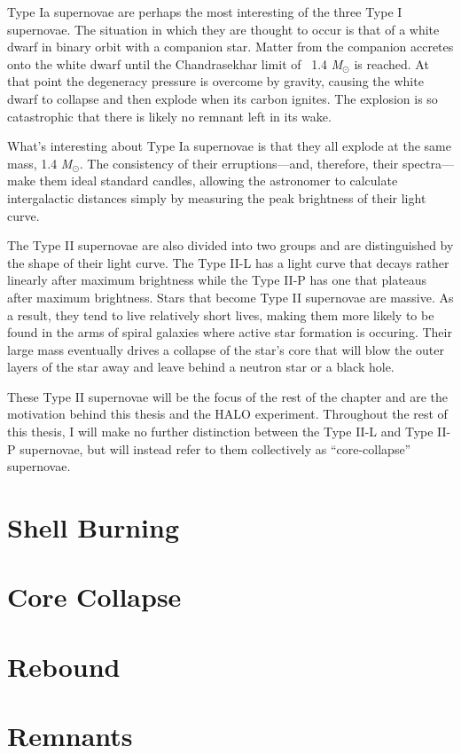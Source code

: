 		Type Ia supernovae are perhaps the most interesting of the three Type I supernovae. The situation in which they are thought to occur is that of a white dwarf in binary orbit with a companion star. Matter from the companion accretes onto the white dwarf until the Chandrasekhar limit of \ 1.4 \emph{M}$_\odot$ is reached. At that point the degeneracy pressure is overcome by gravity, causing the white dwarf to collapse and then explode when its carbon ignites. The explosion is so catastrophic that there is likely no remnant left in its wake. 

		What's interesting about Type Ia supernovae is that they all explode at the same mass, 1.4 \emph{M}$_\odot$. The consistency of their erruptions---and, therefore, their spectra---make them ideal standard candles, allowing the astronomer to calculate intergalactic distances simply by measuring the peak brightness of their light curve.

		The Type II supernovae are also divided into two groups and are distinguished by the shape of their light curve. The Type II-L has a light curve that decays rather linearly after maximum brightness while the Type II-P has one that plateaus after maximum brightness. Stars that become Type II supernovae are massive. As a result, they tend to live relatively short lives, making them more likely to be found in the arms of spiral galaxies where active star formation is occuring. Their large mass eventually drives a collapse of the star's core that will blow the outer layers of the star away and leave behind a neutron star or a black hole.

		These Type II supernovae will be the focus of the rest of the chapter and are the motivation behind this thesis and the HALO experiment. Throughout the rest of this thesis, I will make no further distinction between the Type II-L and Type II-P supernovae, but will instead refer to them collectively as ``core-collapse'' supernovae.
	\section{Shell Burning}
		\filler
	\section{Core Collapse}
		\filler
	\section{Rebound}
		\filler
	\section{Remnants}
		\filler


